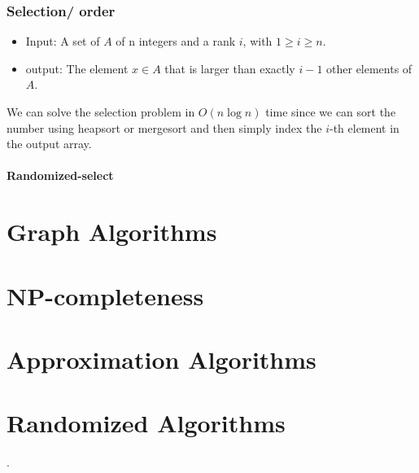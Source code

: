 \documentclass[en,hazy,blue,screen,14pt]{elegantnote}
\begin{document}
\section{Selection/ order}
\begin{itemize}
\item Input: A set of $A$ of n integers and a rank $i$, with $1\ge i\ge n$.
\item output: The element $x\in A$ that is larger than exactly $i-1$ other
elements of $A$.
\end{itemize}
We can solve the selection problem in $O(n\log n)$ time since we
can sort the number using heapsort or mergesort and then simply index
the $i$-th element in the output array.

\subsection{Randomized-select}


\part{Graph Algorithms}

\part{NP-completeness}

\part{Approximation Algorithms}

\part{Randomized Algorithms}.
\end{document}
